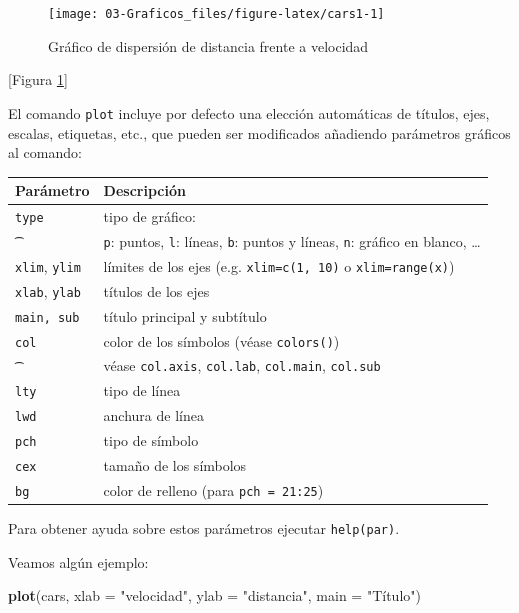 \documentclass[]{book}
\newenvironment{Shaded}{\begin{snugshade}}{\end{snugshade}}
\newcommand{\KeywordTok}[1]{\textcolor[rgb]{0.13,0.29,0.53}{\textbf{#1}}}
\newcommand{\DataTypeTok}[1]{\textcolor[rgb]{0.13,0.29,0.53}{#1}}
\newcommand{\StringTok}[1]{\textcolor[rgb]{0.31,0.60,0.02}{#1}}
\newcommand{\CommentTok}[1]{\textcolor[rgb]{0.56,0.35,0.01}{\textit{#1}}}
\newcommand{\OperatorTok}[1]{\textcolor[rgb]{0.81,0.36,0.00}{\textbf{#1}}}
\newcommand{\NormalTok}[1]{#1}
\begin{document}
\begin{Shaded}
\end{Shaded}

\begin{figure}[!htb]

{\centering \texttt{[image: 03-Graficos\_files/figure-latex/cars1-1]} 

}

\caption{Gráfico de dispersión de distancia frente a velocidad}\label{fig:cars1}
\end{figure}

{[}Figura \ref{fig:cars1}{]}

El comando \texttt{plot} incluye por defecto una elección automáticas de
títulos, ejes, escalas, etiquetas, etc., que pueden ser modificados
añadiendo parámetros gráficos al comando:

\begin{longtable}[]{@{}ll@{}}
\toprule
Parámetro & Descripción\tabularnewline
\midrule
\endhead
\texttt{type} & tipo de gráfico:\tabularnewline
\t & \texttt{p}: puntos, \texttt{l}: líneas, \texttt{b}: puntos y
líneas, \texttt{n}: gráfico en blanco, \ldots{}\tabularnewline
\texttt{xlim}, \texttt{ylim} & límites de los ejes (e.g.
\texttt{xlim=c(1,\ 10)} o \texttt{xlim=range(x)})\tabularnewline
\texttt{xlab}, \texttt{ylab} & títulos de los ejes\tabularnewline
\texttt{main,\ sub} & título principal y subtítulo\tabularnewline
\texttt{col} & color de los símbolos (véase
\texttt{colors()})\tabularnewline
\t & véase \texttt{col.axis}, \texttt{col.lab}, \texttt{col.main},
\texttt{col.sub}\tabularnewline
\texttt{lty} & tipo de línea\tabularnewline
\texttt{lwd} & anchura de línea\tabularnewline
\texttt{pch} & tipo de símbolo\tabularnewline
\texttt{cex} & tamaño de los símbolos\tabularnewline
\texttt{bg} & color de relleno (para
\texttt{pch\ =\ 21:25})\tabularnewline
\bottomrule
\end{longtable}

Para obtener ayuda sobre estos parámetros ejecutar \texttt{help(par)}.

Veamos algún ejemplo:

\begin{Shaded}
\begin{Highlighting}[]
\KeywordTok{plot}\NormalTok{(cars, }\DataTypeTok{xlab =} \StringTok{"velocidad"}\NormalTok{, }\DataTypeTok{ylab =} \StringTok{"distancia"}\NormalTok{, }\DataTypeTok{main =} \StringTok{"Título"}\NormalTok{)}
\end{Highlighting}
\end{Shaded}
\end{document}
